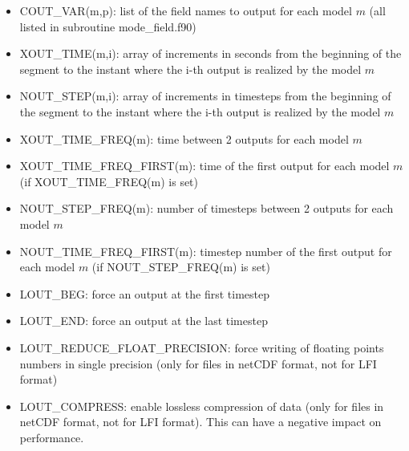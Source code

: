 \begin{itemize}

\item
COUT\_VAR(m,p): list of the field names to output for each model $m$ (all listed in subroutine mode\_field.f90)

\item
{} 
XOUT\_TIME(m,i): array of increments in seconds from the beginning of the segment to the instant where the i-th output is realized by the model $m$

\item
{} 
NOUT\_STEP(m,i): array of increments in timesteps from the beginning of the segment to the instant where the i-th output is realized by the model $m$

\item
{} 
XOUT\_TIME\_FREQ(m): time between 2 outputs for each model $m$

\item
{} 
XOUT\_TIME\_FREQ\_FIRST(m): time of the first output for each model $m$ (if XOUT\_TIME\_FREQ(m) is set)

\item
{} 
NOUT\_STEP\_FREQ(m): number of timesteps between 2 outputs for each model $m$

\item
{} 
NOUT\_TIME\_FREQ\_FIRST(m): timestep number of the first output for each model $m$ (if NOUT\_STEP\_FREQ(m) is set)

\item
{} 
LOUT\_BEG: force an output at the first timestep

\item
{} 
LOUT\_END: force an output at the last timestep

\item
{} 
LOUT\_REDUCE\_FLOAT\_PRECISION: force writing of floating points numbers in single precision (only for files in netCDF format, not for LFI format)

\item
{} 
LOUT\_COMPRESS: enable lossless compression of data (only for files in netCDF format, not for LFI format). This can have a negative impact on performance.


\end{itemize}
